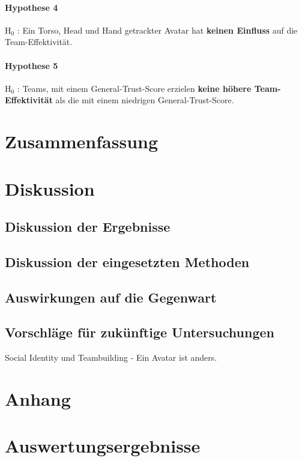 \documentclass[a4paper,11pt]{article}%
\renewcommand{\\}{\vspace*{0.5\baselineskip} \newline}
\begin{document}
\newpage
\paragraph{Hypothese 4}
H$_{0}$ : Ein Torso, Head und Hand getrackter Avatar hat \textbf{keinen Einfluss} auf die Team-Effektivität.\\

\newpage
\paragraph{Hypothese 5}
H$_{0}$ : Teams, mit einem General-Trust-Score erzielen \textbf{keine höhere Team-Effektivität} als die mit einem niedrigen General-Trust-Score.\\

\newpage

\clearpage
	\newpage
	\section{Zusammenfassung}
	\newpage
	\section{Diskussion}
		\subsection{Diskussion der Ergebnisse}
		\subsection{Diskussion der eingesetzten Methoden}
		\subsection{Auswirkungen auf die Gegenwart}
		\subsection{Vorschläge für zukünftige Untersuchungen}
		Social Identity und Teambuilding - Ein Avatar ist anders.
	
	\newpage
	\appendix	
	\section*{Anhang}

	\section{Auswertungsergebnisse}
	
\end{document}
